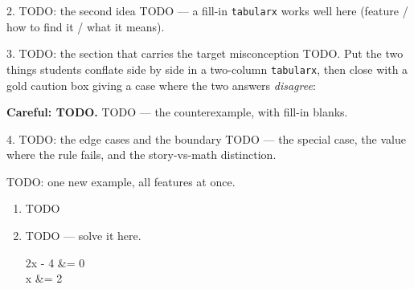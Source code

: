 \documentclass[10pt]{article}
\begin{document}
\boxguard[22]
\begin{notesbox}{2. TODO: the second idea}
TODO --- a fill-in \texttt{tabularx} works well here (feature / how to find it / what it means).
\end{notesbox}

\boxguard[26]
\begin{notesbox}{3. TODO: the section that carries the target misconception}
TODO. Put the two things students conflate side by side in a two-column \texttt{tabularx}, then
close with a gold caution box giving a case where the two answers \emph{disagree}:
\begin{tcolorbox}[colback=goldbg, colframe=goldacc, boxrule=0.8pt, arc=1.5mm,
    left=2.5mm, right=2.5mm, top=1.5mm, bottom=1.5mm]
\textbf{\textcolor{goldacc}{Careful: TODO.}} \; TODO --- the counterexample, with fill-in blanks.
\end{tcolorbox}
\end{notesbox}

\boxguard[20]
\begin{notesbox}{4. TODO: the edge cases and the boundary}
TODO --- the special case, the value where the rule fails, and the story-vs-math distinction.
\end{notesbox}

\begin{practicebox}
TODO: one new example, all features at once.
\begin{enumerate}[leftmargin=1.7em, itemsep=3pt]
  \item TODO \blank{1.2cm}
  \item TODO --- solve it here.
        \begin{work}
          2x - 4 &= 0 \\
               x &= 2
        \end{work}
\end{enumerate}
\end{practicebox}
\end{document}
